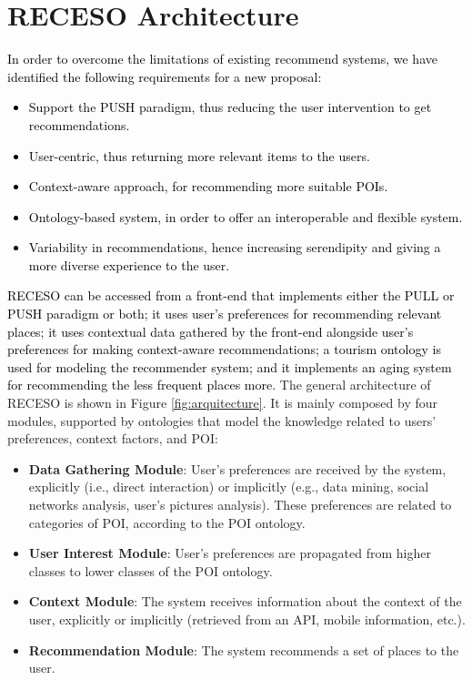 \vspace{-0.2cm}
\section{RECESO Architecture}
\label{sec:proposal}

\textcolor{black}{In order to overcome the limitations of existing recommend systems, we have identified the following requirements for a new proposal:
\begin{itemize}
    \item Support the PUSH paradigm, thus reducing the user intervention to get recommendations.
    \item User-centric, thus returning more relevant items to the users.
    \item Context-aware approach, for recommending more suitable POIs.
    \item Ontology-based system, in order to offer an interoperable and flexible  system.
    \item Variability in recommendations, hence increasing serendipity and giving a more diverse experience to the user.
\end{itemize}
}

\textcolor{black}{RECESO can be accessed from a front-end that implements either the PULL or PUSH paradigm or both; it uses user's preferences for recommending relevant places; it uses contextual data gathered by the front-end alongside user's preferences for making context-aware recommendations; a tourism ontology is used for modeling the recommender system; and it implements an aging system for recommending the less frequent places more.}
The general architecture of RECESO is shown in Figure \ref{fig:arquitecture}. It is mainly composed by four modules, supported by ontologies that model the knowledge related to users' preferences, context factors, and POI:  
\begin{itemize}
    \item \textbf{Data Gathering Module}: User's preferences are received by the system, explicitly (i.e., direct interaction) or implicitly (e.g., data mining, social networks analysis, user's pictures analysis). These preferences are related to categories of POI, according to the POI ontology. 
    \item \textbf{User Interest Module}: User's preferences are propagated from higher classes to lower classes of the POI ontology.
    \item \textbf{Context Module}: The system receives information about the context of the user, explicitly or implicitly (retrieved from an API, mobile information, etc.).
    \item \textbf{Recommendation Module}: The system recommends a set of places to the user.
\end{itemize}

